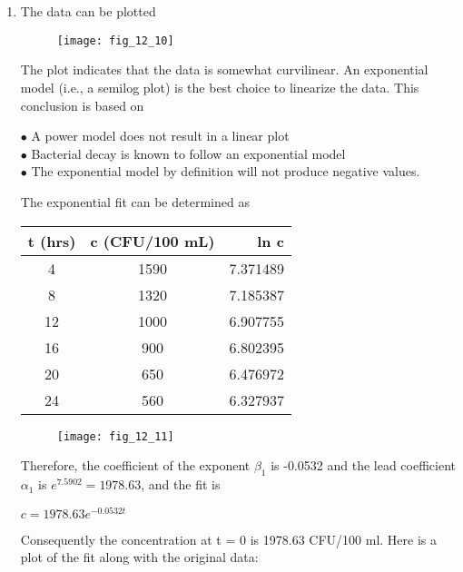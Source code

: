 \documentclass[../main.tex]{subfiles}
\begin{document}
\section{}
\begin{enumerate}[label=\bfseries(\alph*)]
\item The data can be plotted
\bigbreak
	\begin{figure}[H]
		\texttt{[image: fig\_12\_10]}
		\label{fig:fig_12_10}
	\end{figure}
	\bigbreak
\begin{blockquote}
The plot indicates that the data is somewhat curvilinear. An exponential model (i.e., a semilog plot) is the best choice to linearize the data. This conclusion is based on%
\end{blockquote}
	\bigbreak
\begin{blockquote}
$\bullet$ A power model does not result in a linear plot\\
$\bullet$ Bacterial decay is known to follow an exponential model\\
$\bullet$ The exponential model by definition will not produce negative values.
\end{blockquote}
	\bigbreak
The exponential fit can be determined as
	\bigbreak
	\begin{tabular}{|c|c|r|}
		\hline t (hrs)&c (CFU/100 mL)&ln c\\ \hline
			4&1590&7.371489\\ \hline
			8&1320&7.185387\\ \hline
			12&1000&6.907755\\ \hline
			16&900&6.802395\\ \hline
			20&650&6.476972\\ \hline
			24&560&6.327937\\ \hline
	\end{tabular}
	\bigbreak
	\begin{figure}[H]
		\texttt{[image: fig\_12\_11]}
		\label{fig:fig_12_11}
	\end{figure}
	\bigbreak
\begin{blockquote}
Therefore, the coefficient of the exponent $\beta_1$ is -0.0532 and the lead coefficient $\alpha_1$ is $e^{7.5902} = 1978.63$, and the fit is
\end{blockquote}
	\bigbreak
$c=1978.63e^{-0.0532t}$
	\bigbreak
\begin{blockquote}
Consequently the concentration at t = 0 is 1978.63 CFU/100 ml. Here is a plot of the fit along with the original data: 

\end{blockquote}
\end{enumerate}
\end{document}

